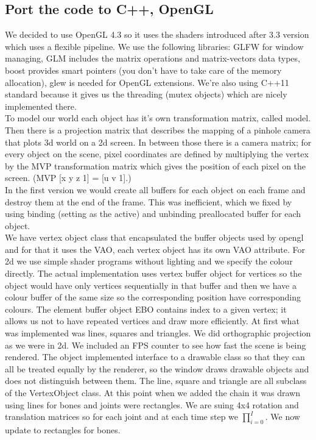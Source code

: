 \documentclass[paper=a4, fontsize=11pt]{scrartcl} %
\numberwithin{equation}{section} %
\numberwithin{figure}{section} %
\numberwithin{table}{section} %
\begin{document}
\subsection{ Port the code to C++, OpenGL}
We decided to use OpenGL 4.3 so it uses the shaders introduced after 3.3 version which uses a flexible pipeline. We use the following libraries: GLFW for window managing, GLM includes the matrix operations and matrix-vectors data types, boost provides smart pointers (you don't have to take care of the memory allocation), glew is needed for OpenGL extensions. We're also using C++11 standard because it gives us the threading (mutex objects) which are nicely implemented there. \\

To model our world each object has it's own transformation matrix, called model. Then there is a projection matrix that describes the mapping of a pinhole camera that plots 3d world on a 2d screen. In between those there is a camera matrix; for every object on the scene, pixel coordinates are defined by multiplying the vertex by the MVP transformation matrix which gives the position of each pixel on the screen. (MVP [x y z 1] = [u  v 1].) \\

In the first version we would create all buffers for each object on each frame and destroy them at the end of the frame. This was inefficient, which we fixed by using binding (setting as the active) and unbinding preallocated buffer for each object. \\

We have vertex object class that encapsulated the buffer objects used by opengl and for that it uses the VAO, each vertex object has its own VAO attribute. For 2d we use simple shader programs without lighting and we specify the colour directly. The actual implementation uses vertex buffer object for vertices so the object would have only vertices sequentially in that buffer and then we have a colour buffer of the same size so the corresponding position have corresponding colours. The element buffer object EBO contains index to a given vertex; it allows us not to have repeated vertices and draw more efficiently. At first what was implemented was lines, squares and triangles. We did orthographic projection as we were in 2d. We included an FPS counter to see how fast the scene is being rendered. The object implemented interface to a drawable class so that they can all be treated equally by  the renderer, so the window draws drawable objects and does not distinguish between them. The line, square and triangle are all subclass of the VertexObject class. At this point when we added the chain it was drawn using lines for bones and joints were rectangles. We are suing 4x4 rotation and translation matrices so for each joint and at each time step we \(\prod_{i=0}^I\).  We now update to rectangles for bones. \\
\end{document}
